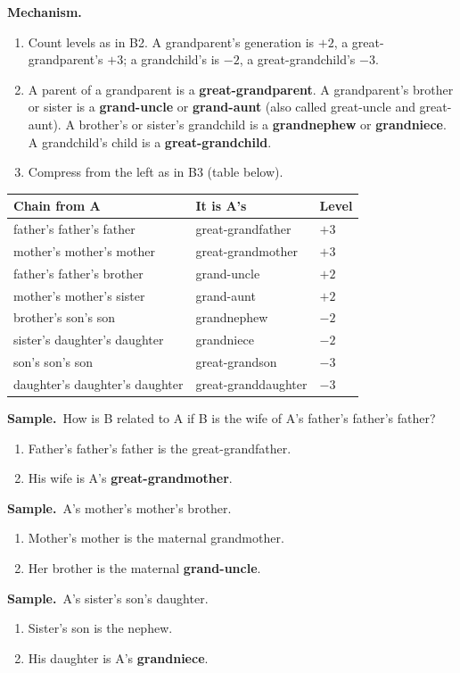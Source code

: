 \documentclass[11pt,a4paper]{article}
\newcommand{\mech}{\textbf{\color{ember}Mechanism.}\ }
\newif\ifkeepsamp
\newcommand{\samp}{\ifkeepsamp\needspace{4\baselineskip}\fi\textbf{\color{ember}Sample.}\ }
\begin{document}
\mech
\begin{enumerate}
\item Count levels as in B2. A grandparent's generation is $+2$, a great-grandparent's $+3$; a grandchild's is $-2$, a great-grandchild's $-3$.
\item A parent of a grandparent is a \textbf{great-grandparent}. A grandparent's brother or sister is a \textbf{grand-uncle} or \textbf{grand-aunt} (also called great-uncle and great-aunt). A brother's or sister's grandchild is a \textbf{grandnephew} or \textbf{grandniece}. A grandchild's child is a \textbf{great-grandchild}.
\item Compress from the left as in B3 (table below).
\end{enumerate}
\begin{center}\small\renewcommand{\arraystretch}{1.18}\setlength{\tabcolsep}{9pt}
\begin{tabular}{@{}lll@{}}
\toprule
\textbf{\color{slate}Chain from A} & \textbf{\color{slate}It is A's} & \textbf{\color{slate}Level} \\ \midrule
father's father's father & great-grandfather & $+3$ \\
mother's mother's mother & great-grandmother & $+3$ \\
father's father's brother & grand-uncle & $+2$ \\
mother's mother's sister & grand-aunt & $+2$ \\
brother's son's son & grandnephew & $-2$ \\
sister's daughter's daughter & grandniece & $-2$ \\
son's son's son & great-grandson & $-3$ \\
daughter's daughter's daughter & great-granddaughter & $-3$ \\
\bottomrule
\end{tabular}\end{center}

\samp How is B related to A if B is the wife of A's father's father's father?
\begin{enumerate}
\item Father's father's father is the great-grandfather.
\item His wife is A's \textbf{great-grandmother}.
\end{enumerate}
\samp A's mother's mother's brother.
\begin{enumerate}
\item Mother's mother is the maternal grandmother.
\item Her brother is the maternal \textbf{grand-uncle}.
\end{enumerate}
\samp A's sister's son's daughter.
\begin{enumerate}
\item Sister's son is the nephew.
\item His daughter is A's \textbf{grandniece}.
\end{enumerate}
\end{document}
